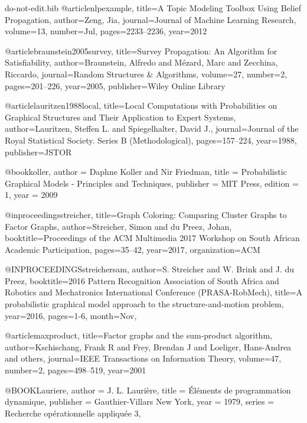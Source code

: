 \documentclass{ieeeaccess}
\begin{document}
{\begin{filecontents*}[overwrite]{do-not-edit.bib}
		@article{nlpexample,
			title={{A} {T}opic {M}odeling {T}oolbox {U}sing {B}elief {P}ropagation},
			author={Zeng, Jia},
			journal={Journal of Machine Learning Research},
			volume={13},
			number={Jul},
			pages={2233--2236},
			year={2012}
		}
		
		@article{braunstein2005survey,
			title={{S}urvey {P}ropagation: {A}n {A}lgorithm {f}or {S}atisfiability},
			author={Braunstein, Alfredo and M{\'e}zard, Marc and Zecchina, Riccardo},
			journal={Random Structures \& Algorithms},
			volume={27},
			number={2},
			pages={201--226},
			year={2005},
			publisher={Wiley Online Library}
		}
		
		
		@article{lauritzen1988local,
			title={{L}ocal {C}omputations with {P}robabilities on {G}raphical {S}tructures and {T}heir {A}pplication to {E}xpert {S}ystems},
			author={Lauritzen, Steffen L. and Spiegelhalter, David J.},
			journal={Journal of the Royal Statistical Society. Series B (Methodological)},
			pages={157--224},
			year={1988},
			publisher={JSTOR}
		}
			
		@book{koller,
			author    = {Daphne Koller and Nir Friedman},
			title     = {Probabilistic Graphical Models - Principles and Techniques},
			publisher = {{MIT} Press},
			edition   = 1,
			year      = {2009}
		}
		
		@inproceedings{streicher,
			title={{G}raph {C}oloring: {C}omparing {C}luster {G}raphs to {F}actor {G}raphs},
			author={Streicher, Simon and du Preez, Johan},
			booktitle={Proceedings of the ACM Multimedia 2017 Workshop on South African Academic Participation},
			pages={35--42},
			year={2017},
			organization={ACM}
		}
		
		@INPROCEEDINGS{streichersam,
			author={S. {S}treicher and W. {B}rink and J. {du} {P}reez},
			booktitle={2016 Pattern Recognition Association of South Africa and Robotics and Mechatronics International Conference (PRASA-RobMech)},
			title={A probabilistic graphical model approach to the structure-and-motion problem},
			year={2016},
			pages={1-6},
			month={Nov},
		}
		
		@article{maxproduct,
			title={Factor graphs and the sum-product algorithm},
			author={Kschischang, Frank R and Frey, Brendan J and Loeliger, Hans-Andrea and others},
			journal={{IEEE} {T}ransactions on {I}nformation {T}heory},
			volume={47},
			number={2},
			pages={498--519},
			year={2001}
		}
		
		@BOOK{Lauriere,
			author = {{J. L.} Lauri\`ere},
			title = {\'El\'ements de programmation dynamique},
			publisher = {Gauthier-Villars New York},
			year = {1979},
			series = {Recherche op\'erationnelle appliqu\'ee 3},
		}
		

\end{filecontents*}}
\end{document}
